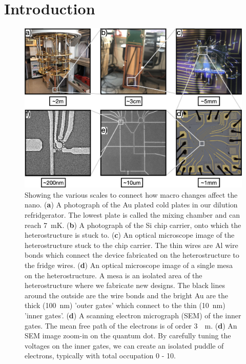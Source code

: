 \chapter{Introduction}\label{cha:intro}


\begin{figure}[!htb]
  \begin{center}
    \includegraphics[width=1.0\textwidth]{figures/ch1/crop_FiguresMaster.001.png}
    \caption[Dilution fridge to quantum dot scale breakdown]{\label{fig:ch1/scale_breakdown} 
    Showing the various scales to connect how macro changes affect the nano. (\textbf{a}) A photograph of the Au plated cold plates in our dilution refridgerator. The lowest plate is called the mixing chamber and can reach \qty{7}{mK}. (\textbf{b}) A photograph of the Si chip carrier, onto which the heterostructure is stuck to. (\textbf{c}) An optical microscope image of the heterostructure stuck to the chip carrier. The thin wires are Al wire bonds which connect the device fabricated on the heterostructure to the fridge wires. (\textbf{d}) An optical microscope image of a single mesa on the heterostructure. A mesa is an isolated area of the heterostructure where we fabricate new designs. The black lines around the outside are the wire bonds and the bright Au are the thick (\qty{100}{nm}) 'outer gates' which connect to the thin (\qty{10}{nm}) 'inner gates'. (\textbf{d}) A scanning electron micrograph (SEM) of the inner gates. The mean free path of the electrons is of order \qty{3}{\mu m}.  (\textbf{d}) An SEM image zoom-in on the quantum dot. By carefully tuning the voltages on the inner gates, we can create an isolated puddle of electrons, typically with total occupation 0 - 10.  
      }
  \end{center}
\end{figure}


